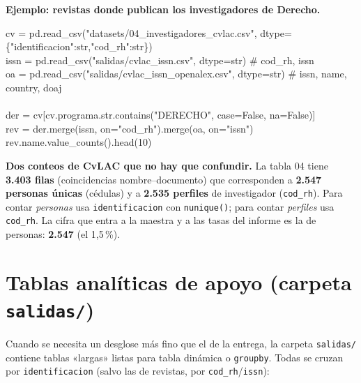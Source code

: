 \documentclass[11pt,letterpaper]{article}
\newcommand{\col}[1]{\texttt{\small #1}}
\begin{document}
\noindent\textbf{Ejemplo: revistas donde publican los investigadores de Derecho.}
\begin{code}\ttfamily\small
cv   = pd.read\_csv("datasets/04\_investigadores\_cvlac.csv", dtype=\{"identificacion":str,"cod\_rh":str\})\\
issn = pd.read\_csv("salidas/cvlac\_issn.csv",          dtype=str)  \# cod\_rh, issn\\
oa   = pd.read\_csv("salidas/cvlac\_issn\_openalex.csv", dtype=str)  \# issn, name, country, doaj\\
\\
der = cv[cv.programa.str.contains("DERECHO", case=False, na=False)]\\
rev = der.merge(issn, on="cod\_rh").merge(oa, on="issn")\\
rev.name.value\_counts().head(10)
\end{code}

\begin{caja}
\textbf{Dos conteos de CvLAC que no hay que confundir.} La tabla 04 tiene \textbf{3.403 filas} (coincidencias nombre--documento) que corresponden a \textbf{2.547 personas únicas} (cédulas) y a \textbf{2.535 perfiles} de investigador (\col{cod\_rh}). Para contar \emph{personas} usa \col{identificacion} con \col{nunique()}; para contar \emph{perfiles} usa \col{cod\_rh}. La cifra que entra a la maestra y a las tasas del informe es la de personas: \textbf{2.547} (el 1,5\,\%).
\end{caja}

\section{Tablas analíticas de apoyo (carpeta \texttt{salidas/})}

Cuando se necesita un desglose más fino que el de la entrega, la carpeta \col{salidas/} contiene tablas «largas» listas para tabla dinámica o \col{groupby}. Todas se cruzan por \col{identificacion} (salvo las de revistas, por \col{cod\_rh}/\col{issn}):
\end{document}
